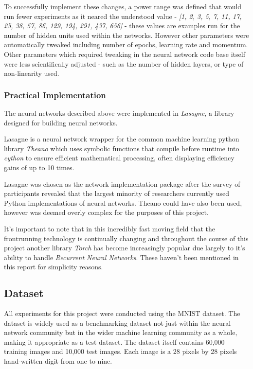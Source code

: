 \documentclass[a4paper,11pt,titlepage]{article}
\begin{document}
		\par 
		To successfully implement these changes, a power range was defined that would run fewer experiments as it neared the understood value - \textit{[1, 2, 3, 5, 7, 11, 17, 25, 38, 57, 86, 129, 194, 291, 437, 656]} - these values are examples run for the number of hidden units used within the networks. However other parameters were automatically tweaked including number of epochs, learning rate and momentum. Other parameters which required tweaking in the neural network code base itself were less scientifically adjusted - such as the number of hidden layers, or type of non-linearity used.
		
		\subsubsection{Practical Implementation}
		The neural networks described above were implemented in \textit{Lasagne}, a library designed for building neural networks.
		\par 
		Lasagne is a neural network wrapper for the common machine learning python library \textit{Theano} which uses symbolic functions that compile before runtime into \textit{cython} to ensure efficient mathematical processing, often displaying efficiency gains of up to 10 times.
		\par 
		Lasagne was chosen as the network implementation package after the survey of participants revealed that the largest minority of researchers currently used Python implementations of neural networks. Theano could have also been used, however was deemed overly complex for the purposes of this project. 
		\par 
		It's important to note that in this incredibly fast moving field that the frontrunning technology is continually changing and throughout the course of this project another library \textit{Torch} has become increasingly popular due largely to it's ability to handle \textit{Recurrent Neural Networks}. These haven't been mentioned in this report for simplicity reasons. 
	
	\subsection{Dataset}

	All experiments for this project were conducted using the MNIST dataset. The dataset is widely used as a  benchmarking dataset not just within the neural network community but in the wider machine learning community as a whole, making it appropriate as a test dataset. The dataset itself contains 60,000 training images and 10,000 test images. Each image is a 28 pixels by 28 pixels hand-written digit from one to nine.
	
\end{document}
